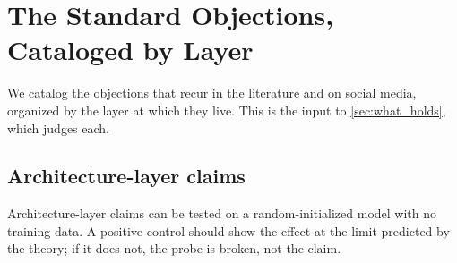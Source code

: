 
\section{The Standard Objections, Cataloged by Layer}
\label{sec:catalog}

We catalog the objections that recur in the literature and on social media, organized by the layer at which they live.
This is the input to \cref{sec:what_holds}, which judges each.

\subsection{Architecture-layer claims}
\label{ssec:arch_claims}

Architecture-layer claims can be tested on a random-initialized model with no training data.
A positive control should show the effect at the limit predicted by the theory;
if it does not, the probe is broken, not the claim.

